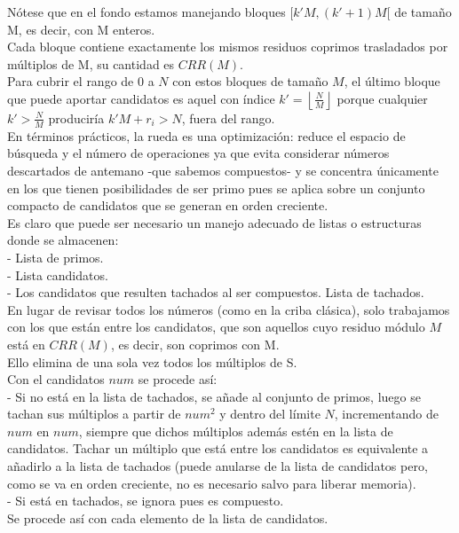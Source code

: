 Nótese que en el fondo estamos manejando bloques $[k'M,(k'+1)M[$ de tamaño M, es decir, con M enteros. \\
Cada bloque contiene exactamente los mismos residuos coprimos trasladados por múltiplos de M, su cantidad es $CRR(M)$. \\
Para cubrir el rango de $0$ a $N$ con estos bloques de tamaño $M$, el último bloque que puede aportar candidatos es aquel con índice
$k'=\left\lfloor \frac{N}{M}\right\rfloor$ porque cualquier $k'>\frac{N}{M}$ produciría $k'M+r_i>N$, fuera del rango. \\

En términos prácticos, la rueda es una optimización: reduce el espacio de búsqueda y el número de operaciones ya que evita considerar números descartados de antemano -que sabemos compuestos- y se concentra únicamente en los que tienen posibilidades de ser primo pues se aplica sobre un conjunto compacto de candidatos que se generan en orden creciente. \\
Es claro que puede ser necesario un manejo adecuado de listas o estructuras donde se almacenen: \\
- Lista de primos. \\
- Lista candidatos. \\
- Los candidatos que resulten tachados al ser compuestos. Lista de tachados. \\
En lugar de revisar todos los números (como en la criba clásica), solo trabajamos con los que están entre los candidatos, que son aquellos cuyo residuo módulo $M$ está en $CRR(M)$, es decir, son coprimos con M. \\
Ello elimina de una sola vez todos los múltiplos de S.\\
Con el candidatos $num$ se procede así: \\
- Si no está en la lista de tachados, se añade al conjunto de primos, luego se tachan sus múltiplos a partir de $num^2$ y dentro del límite $N$, incrementando de $num$ en $num$, siempre que dichos múltiplos además estén en la lista de candidatos. Tachar un múltiplo que está entre los candidatos es equivalente a añadirlo a la lista de tachados (puede anularse de la lista de candidatos pero, como se va en orden creciente, no es necesario salvo para liberar memoria). \\
- Si está en tachados, se ignora pues es compuesto. \\
Se procede así con cada elemento de la lista de candidatos.

